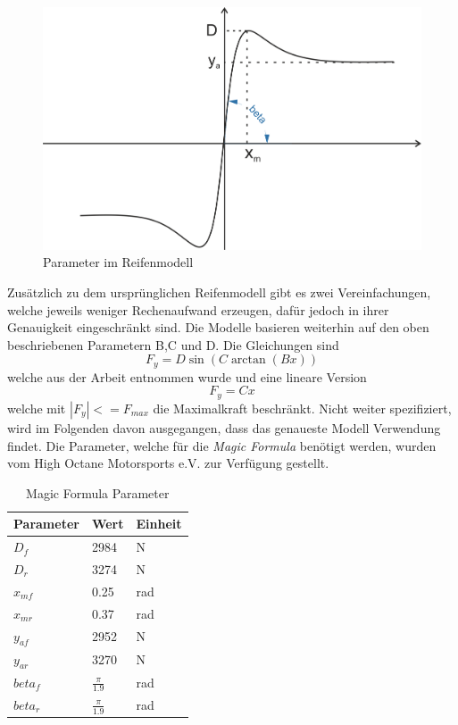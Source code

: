 \documentclass{like}
\begin{document}
\begin{figure}[ht!]
	\centering
	\includegraphics[width=350pt]{Abbildungen/tireModel.png}
	\caption{Parameter im Reifenmodell}
	\label{fig:tireModelParameter}
\end{figure}
 
Zusätzlich zu dem ursprünglichen Reifenmodell gibt es zwei Vereinfachungen, welche jeweils weniger Rechenaufwand erzeugen, dafür jedoch in ihrer Genauigkeit eingeschränkt sind. Die Modelle basieren weiterhin auf den oben beschriebenen Parametern B,C und D. Die Gleichungen sind 
\begin{equation}
	F_y = D\sin(C\arctan(Bx))
\end{equation} 
welche aus der Arbeit \cite{rc_car_1_43} entnommen wurde und eine lineare Version 
\begin{equation}
	F_y = C x 
\end{equation} 
welche mit $|F_y| <= F_{max} $ die Maximalkraft beschränkt. Nicht weiter spezifiziert, wird im Folgenden davon ausgegangen, dass das genaueste Modell Verwendung findet. Die Parameter, welche für die \textit{Magic Formula} benötigt werden, wurden vom High Octane Motorsports e.V. zur Verfügung gestellt.

\begin{table}[]
	\centering
	\begin{tabular}{l|l|l}
		\hline
		Parameter	&  Wert  & Einheit \\ \hline
		\(D_f\)		&  2984 & N \\
		\(D_r\)		&  3274 & N \\
		\(x_{mf}\)	&  0.25 & rad \\
		\(x_{mr}\)	&  0.37 & rad \\
		\(y_{af}\)	&  2952 & N \\
 		\(y_{ar}\)	&  3270 & N \\
		\(beta_{f}\)	&  $\frac{\pi}{1.9}$ & rad \\
		\(beta_{r}\)	&  $\frac{\pi}{1.9}$ & rad \\
		
	\end{tabular}
	\caption{Magic Formula Parameter}
	\label{tireParam}
\end{table}
\end{document}
